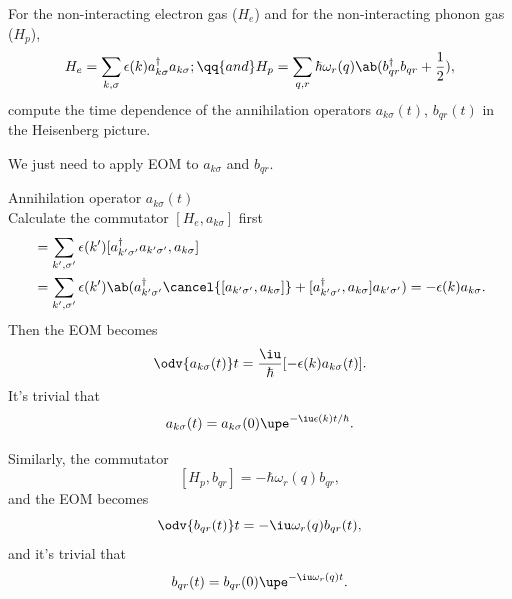 \begin{problem}
  For the non-interacting electron gas ($H_e$) and
  for the non-interacting phonon gas ($H_p$),
  \[
    H_e = \sum_{k,\sigma} \epsilon(k) a_{k\sigma}^\dagger a_{k\sigma}; \qq{and}
    H_p = \sum_{q,r} \hbar \omega_r(q) \ab(b_{qr}^\dagger b_{qr} + \frac12),
  \]
  compute the time dependence of the annihilation operators
  $a_{k\sigma}(t)$, $b_{qr}(t)$ in the Heisenberg picture.
\end{problem}
\begin{solution}
  We just need to apply EOM to $a_{k\sigma}$ and $b_{qr}$.
  \begin{enumext}[label = (\alph*)]
    \item Annihilation operator $a_{k\sigma}(t)$\\
    Calculate the commutator $[H_e, a_{k\sigma}]$ first
    \begin{align*}
      [H_e, a_{k\sigma}] & = \sum_{k',\sigma'}
      \epsilon(k')[a_{k'\sigma'}^\dagger a_{k'\sigma'}, a_{k\sigma}]\\
      & = \sum_{k',\sigma'}
      \epsilon(k') \ab(a_{k'\sigma'}^\dagger \cancel{[a_{k'\sigma'}, a_{k\sigma}]}
      + [a_{k'\sigma'}^\dagger, a_{k\sigma}] a_{k'\sigma'})
      = -\epsilon(k) a_{k\sigma}.
    \end{align*}
    Then the EOM becomes
    \[
      \odv{a_{k\sigma}(t)}t = \frac\iu\hbar [-\epsilon(k) a_{k\sigma}(t)].
    \]
    It's trivial that
    \[
      a_{k\sigma}(t) = a_{k\sigma}(0) \upe^{-\iu\epsilon(k)t/\hbar}.
    \]
    \item Similarly, the commutator
    \[
      [H_p, b_{qr}] = -\hbar \omega_r(q) b_{qr},
    \]
    and the EOM becomes
    \[
      \odv{b_{qr}(t)}t = -\iu\omega_r(q) b_{qr}(t),
    \]
    and it's trivial that
    \[
      b_{qr}(t) = b_{qr}(0) \upe^{-\iu\omega_r(q)t}.
    \]
  \end{enumext}
\end{solution}

